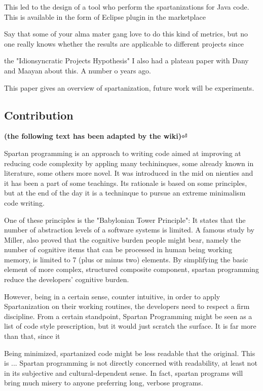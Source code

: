 This led to the design of a tool who perform the spartanizations for Java code.
This is available in the form of Eclipse plugin in the 
marketplace

Say that some of your alma mater gang love to do this kind of metrics, but
no one really knows whether the results are applicable to different projects
since \cite{Turnu:Concas:Marchesi:Tonelli:11}

the "Idionsyncratic Projects Hypothesis" I also had a plateau paper with
Dany and Maayan about this. A number o years ago.

This paper gives an overview of spartanization, future work will be
experiments.

\subsection{Contribution}

\textbf{(the following text has been adapted by the wiki)}⏎

Spartan programming is an approach to writing code aimed at improving at
reducing code complexity by appling many techininques, some already known in
literature, some others more novel. It was introduced in the mid on nienties
and it has been a part of some teachings. Its rationale is based on some
principles, but at the end of the day it is a techninque to pursue an extreme
minimalism code writing.

One of these principles is the "Babylonian Tower Principle": It states that the
number of abstraction levels of a software systems is limited. A famous study
by Miller, also proved that the cognitive burden people might bear, namely the
number of cognitive items that can be processed in human being working memory,
is limited to 7 (plus or minus two) elements. By simplifying the basic element
of more complex, structured composite component, spartan programming reduce the
developers' cognitive burden.

However, being in a certain sense, counter intuitive, in order to apply
Spartanization on their working routines, the developers need to respect a firm
discipline. From a certain standpoint, Spartan Programming might be seen as a
list of code style prescription, but it would just scratch the surface. It is
far more than that, since it

Being minimized, spartanized code might be less readable that the original.
This is ... Spartan programming is not directly concerned with readability, at
least not in its subjective and cultural-dependent sense. In fact, spartan
programs will bring much misery to anyone preferring long, verbose programs.

